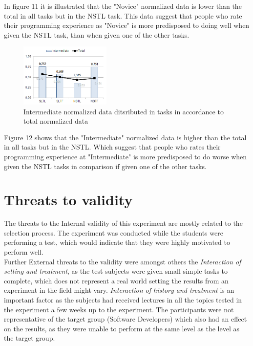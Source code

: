 \documentclass{sig-alternate-05-2015}
\begin{document}
In figure 11 it is illustrated that the "Novice" normalized data is lower than the total in all tasks but in the NSTL task. This data suggest that people who rate their programming experience as "Novice" is more predisposed to doing well when given the NSTL task, than when given one of the other tasks.

\begin{figure}[H]
	\centering
	\includegraphics[width=0.4\textwidth]{img12}
	\caption{Intermediate normalized data ditsributed in tasks in accordance to total normalized data}
\end{figure}

Figure 12 shows that the "Intermediate" normalized data is higher than the total in all tasks but in the NSTL. Which suggest that people who rates their programming experience at "Intermediate" is more predisposed to do worse when given the NSTL tasks in comparison if given one of the other tasks.

\section{Threats to validity}

The threats to the Internal validity of this experiment are mostly related to the selection process. The experiment was conducted while the students were performing a test, which would indicate that they were highly motivated to perform well.\\

Further External threats to the validity were amongst others the \textit{Interaction of setting and treatment}, as the test subjects were given small simple tasks to complete, which does not represent a real world setting the results from an experiment in the field might vary. \textit{Interaction of history and treatment} is an important factor as the subjects had received lectures in all the topics tested in the experiment a few weeks up to the experiment. The participants were not representative of the target group (Software Developers) which also had an effect on the results, as they were unable to perform at the same level as the level as the target group.\\
\end{document}
